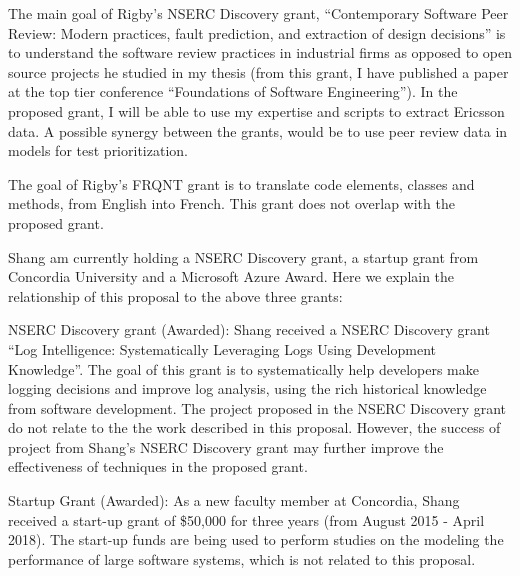\documentclass[12pt, letterpaper]{article}
\begin{document}
\fancyhead{}
\pagestyle{fancy}
\renewcommand{\headrulewidth}{0pt}

\begin{center}
\begin{LARGE}
\noindent
{}
\end{LARGE}
\end{center}


The main goal of Rigby's NSERC Discovery grant, “Contemporary Software Peer Review:
Modern practices, fault prediction, and extraction of design decisions” is to
understand the software review practices in industrial firms as opposed to open
source projects he studied in my thesis (from this grant, I have published a
paper at the top tier conference “Foundations of Software Engineering”). 
%
In the proposed grant, I will be able to use my expertise and scripts to
extract Ericsson data. A possible synergy between the grants, would be to use
peer review data in models for test prioritization. 

The goal of Rigby's FRQNT grant is to translate code elements, classes and methods,
from English into French. This grant does not overlap with the proposed grant.



Shang am currently holding a NSERC Discovery grant, a startup grant from Concordia University and a Microsoft Azure Award. Here we explain the relationship of this proposal to the above three grants:

NSERC Discovery grant (Awarded): Shang received a NSERC Discovery grant ``Log Intelligence: Systematically Leveraging Logs Using Development Knowledge''. The goal of this grant is to systematically help developers make logging decisions and improve log analysis, using the rich historical knowledge from software development. The project proposed in the NSERC Discovery grant do not relate to the the work described in this proposal. However, the success of project from Shang's NSERC Discovery grant may further improve the effectiveness of techniques in the proposed grant.

Startup Grant (Awarded): As a new faculty member at Concordia, Shang received a start-up grant of \$50,000 for three years (from August 2015 - April 2018). The start-up funds are being used to perform studies on the modeling the performance of large software systems, which is not related to this proposal. 
\end{document}
